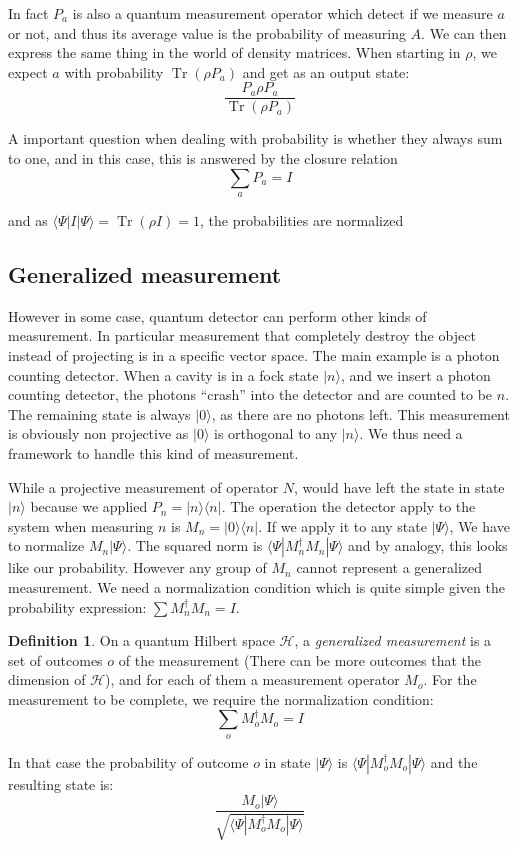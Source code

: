\documentclass[10pt]{report}
\theoremstyle{plain}
\theoremstyle{definition}
\newtheorem{defn}{Definition}[chapter]
\theoremstyle{remark}
\newcommand{\ket}[1]{|#1\rangle}
\newcommand{\bra}[1]{\langle#1|}
\DeclareMathOperator{\Tr}{Tr}
\begin{document}
In fact $P_a$ is also a quantum measurement operator which detect if we measure
$a$ or not, and thus its average value is the probability of measuring $A$. We
can then express the same thing in the world of density matrices. When starting in
$\rho$, we expect $a$ with probability $\Tr(\rho P_a)$ and get as an output
state:
\[ \frac{P_a \rho P_a}{\Tr(\rho P_a)}\]

A important question when dealing with probability is whether they always sum to
one, and in this case, this is answered by the closure relation
\[\sum_a P_a = I\]

and as $\bra \Psi I \ket \Psi = \Tr(\rho I) = 1$, the probabilities are normalized

\subsection{Generalized measurement}

However in some case, quantum detector can perform other kinds of measurement.
In particular measurement that completely destroy the object instead of
projecting is in a specific vector space. The main example is a photon counting
detector. When a cavity is in a fock state $\ket n$, and we insert a photon
counting detector, the photons ``crash'' into the detector and are counted to be
$n$. The remaining state is always $\ket 0$, as there are no photons left. This
measurement is obviously non projective as $\ket 0$ is orthogonal to any $\ket
n$. We thus need a framework to handle this kind of measurement.

While a projective measurement of operator $N$, would have left the state in
state $\ket n$ because we applied $P_n = \ket n \bra n$.
The operation the detector apply to the system when measuring $n$ is $M_n = \ket
0 \bra n$. If we apply it to any state $\ket \Psi$, We have to normalize $M_n
\ket \Psi$. The squared norm is $\bra \Psi M_n^\dagger M_n \ket \Psi$ and by
analogy, this looks like our probability. However any group of $M_n$ cannot
represent a generalized measurement. We need a normalization condition which is
quite simple given the probability expression: $\sum M_n^\dagger M_n = I$.

\begin{defn}
  On a quantum Hilbert space $\mathcal{H}$, a \emph{generalized measurement} is a set
  of outcomes $o$ of the measurement (There can be more outcomes that the
  dimension of $\mathcal{H}$), and for each of them a measurement
  operator $M_o$. For the measurement to be complete, we require the
  normalization condition:
  \[\sum_o M_o^\dagger M_o = I\]

  In that case the probability of outcome $o$ in state $\ket \Psi$ is $\bra \Psi
  M_o^\dagger M_o \ket \Psi$ and the resulting state is:
\[\frac{M_o \ket \Psi}{\sqrt{\bra \Psi M_o^\dagger M_o \ket \Psi}}\]
\end{defn}
\end{document}
